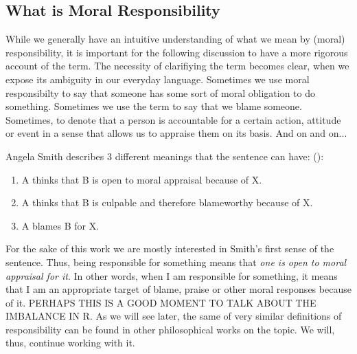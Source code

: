 \documentclass{article}
\begin{document}
\subsection{What is Moral Responsibility}

While we generally have an intuitive understanding of what we mean
by (moral) responsibility, it is important for the following discussion to have
a more rigorous account of the term. The necessity of clarifiying the term
becomes clear, when we expose its ambiguity in our everyday language.
Sometimes we use moral responsibilty to say that someone has some sort of moral
obligation to do something. Sometimes we use the term to say that we blame
someone. Sometimes, to denote that a person is accountable for a certain action,
attitude or event in a sense that allows us to appraise them on its basis. And on and on...

Angela Smith describes 3 different meanings that the sentence
 can have:
(\cite[p. 469]{Smith_2007}):

\begin{enumerate}
	\item A thinks that B is open to moral appraisal because of X.\\
	\item A thinks that B is culpable and therefore blameworthy because of
		X.\\
	\item A blames B for X.
\end{enumerate}

For the sake of this work we are mostly interested in Smith's first sense of the
sentence. Thus, being responsible for something means that \textit{one is open to moral
appraisal for it}. In other words, when I am responsible for something, it means
that I am an appropriate target of blame, praise or other moral responses
because of it. PERHAPS THIS IS A GOOD MOMENT TO TALK ABOUT THE IMBALANCE IN R.
As we will see later, the same of very similar definitions of
responsibility can be found in other philosophical works on the topic. We
will, thus, continue working with it.
\end{document}
